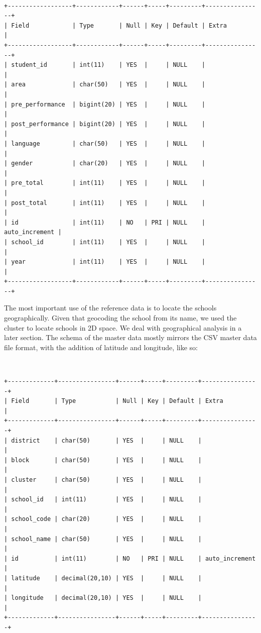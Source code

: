 \documentclass[10pt]{article}
\begin{document}
{\tt
\begin{verbatim}
+------------------+------------+------+-----+---------+----------------+
| Field            | Type       | Null | Key | Default | Extra          |
+------------------+------------+------+-----+---------+----------------+
| student_id       | int(11)    | YES  |     | NULL    |                |
| area             | char(50)   | YES  |     | NULL    |                |
| pre_performance  | bigint(20) | YES  |     | NULL    |                |
| post_performance | bigint(20) | YES  |     | NULL    |                |
| language         | char(50)   | YES  |     | NULL    |                |
| gender           | char(20)   | YES  |     | NULL    |                |
| pre_total        | int(11)    | YES  |     | NULL    |                |
| post_total       | int(11)    | YES  |     | NULL    |                |
| id               | int(11)    | NO   | PRI | NULL    | auto_increment |
| school_id        | int(11)    | YES  |     | NULL    |                |
| year             | int(11)    | YES  |     | NULL    |                |
+------------------+------------+------+-----+---------+----------------+
\end{verbatim}
}

The most important use of the reference data is to locate the schools geographically. Given that geocoding the school from its name, we used the cluster to locate schools in 2D space. We deal with geographical analysis in a later section. The schema of the master data mostly mirrors the CSV master data file format, with the addition of latitude and longitude, like so:

{\tt
\begin{verbatim}
+-------------+----------------+------+-----+---------+----------------+
| Field       | Type           | Null | Key | Default | Extra          |
+-------------+----------------+------+-----+---------+----------------+
| district    | char(50)       | YES  |     | NULL    |                |
| block       | char(50)       | YES  |     | NULL    |                |
| cluster     | char(50)       | YES  |     | NULL    |                |
| school_id   | int(11)        | YES  |     | NULL    |                |
| school_code | char(20)       | YES  |     | NULL    |                |
| school_name | char(50)       | YES  |     | NULL    |                |
| id          | int(11)        | NO   | PRI | NULL    | auto_increment |
| latitude    | decimal(20,10) | YES  |     | NULL    |                |
| longitude   | decimal(20,10) | YES  |     | NULL    |                |
+-------------+----------------+------+-----+---------+----------------+
\end{verbatim}
}
\end{document}
